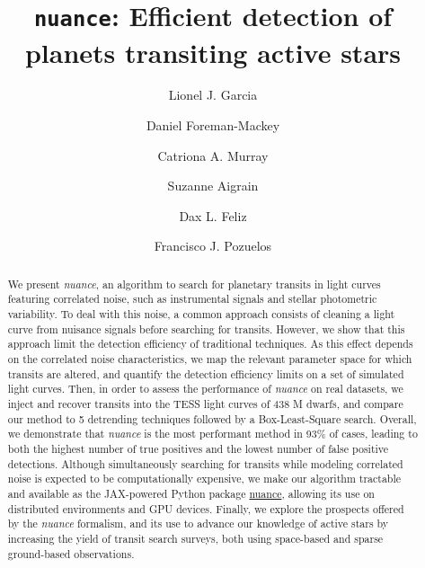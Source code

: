 \documentclass[modern]{aastex631}
\newcommand{\nuancemethod}{\textit{nuance}}
\newcommand{\nuancecode}{\textsf{nuance}}
\begin{document}
\title{\texttt{nuance}: Efficient detection of planets transiting active stars}

\author{Lionel J. Garcia}
\author{Daniel Foreman-Mackey}
\author{Catriona A. Murray}
\author{Suzanne Aigrain}
\author{Dax L. Feliz}
\author{Francisco J. Pozuelos}


\begin{abstract}
    We present \nuancemethod{}, an algorithm to search for planetary transits in light curves featuring correlated noise, such as instrumental signals and stellar photometric variability. To deal with this noise, a common approach consists of cleaning a light curve from nuisance signals before searching for transits. However, we show that this approach limit the detection efficiency of traditional techniques. As this effect depends on the correlated noise characteristics, we map the relevant parameter space for which transits are altered, and quantify the detection efficiency limits on a set of simulated light curves. Then, in order to assess the performance of \nuancemethod{} on real datasets, we inject and recover transits into the TESS light curves of 438 M dwarfs, and compare our method to 5 detrending techniques followed by a Box-Least-Square search. Overall, we demonstrate that \nuancemethod{} is the most performant method in 93\% of cases, leading to both the highest number of true positives and the lowest number of false positive detections. Although simultaneously searching for transits while modeling correlated noise is expected to be computationally expensive, we make our algorithm tractable and available as the \textsf{JAX}-powered Python package \href{https://github.com/lgrcia/nuance}{\nuancecode{}}, allowing its use on distributed environments and GPU devices. Finally, we explore the prospects offered by the \nuancemethod{} formalism, and its use to advance our knowledge of active stars by increasing the yield of transit search surveys, both using space-based and sparse ground-based observations.
\end{abstract}
\end{document}
